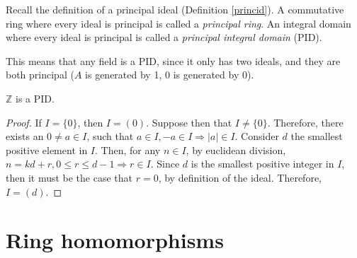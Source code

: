 
\begin{definition}
  Recall the definition of a principal ideal (Definition \ref{princid}). A commutative ring where every ideal is principal is called a \emph{principal ring}. An integral domain where every ideal is principal is called a \emph{principal integral domain} (PID). 
\end{definition}

This means that any field is a PID, since it only has two ideals, and they are both principal ($A$ is generated by 1, ${0}$ is generated by 0).

\begin{theorem*}
  $\mathbb{Z}$ is a PID. 
\end{theorem*}
\begin{proof}
  If $I = \{0\}$, then $I = (0)$. Suppose then that $I \neq \{0\}$. Therefore, there exists an $0 \neq a \in I$, such that $a \in I, -a \in I \Rightarrow |a| \in I$. Consider $d$ the smallest positive element in $I$. Then, for any $n \in I$, by euclidean division, $n = kd + r, 0 \leqslant r \leqslant d-1\Rightarrow r \in I$. Since $d$ is the smallest positive integer in $I$, then it must be the case that $r = 0$, by definition of the ideal. Therefore, $I = (d)$.  
\end{proof}

\section{Ring homomorphisms}

